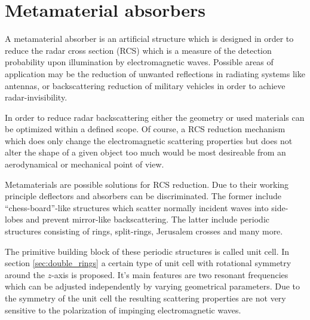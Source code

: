 \section{Metamaterial absorbers}
A metamaterial absorber is an artificial structure which is designed in order to
reduce the radar cross section (RCS) which is a measure of the detection probability upon illumination by electromagnetic waves. Possible areas of application 
may be the reduction of unwanted reflections in radiating systems like antennas, or backscattering reduction of military vehicles in order to achieve radar-invisibility.

In order to reduce radar backscattering either the geometry or used materials can be optimized within a defined scope. Of course, a RCS reduction mechanism which does only change the electromagnetic scattering properties but does not alter the shape of a given object too much would be most desireable from an aerodynamical or mechanical point of view.

Metamaterials are possible solutions for RCS reduction. Due to their working principle deflectors and absorbers can be discriminated. The former include "`chess-board"'-like structures which scatter normally incident waves into side-lobes and prevent mirror-like backscattering. The latter include periodic structures consisting of rings, split-rings, Jerusalem crosses and many more.

The primitive building block of these periodic structures is called unit cell. In section \ref{sec:double_rings} a certain type of unit cell with rotational symmetry around the $z$-axis is proposed. It's main features are two resonant frequencies which can be adjusted independently by varying geometrical parameters. Due to the symmetry of the unit cell the resulting scattering properties are not very sensitive to the polarization of impinging electromagnetic waves.